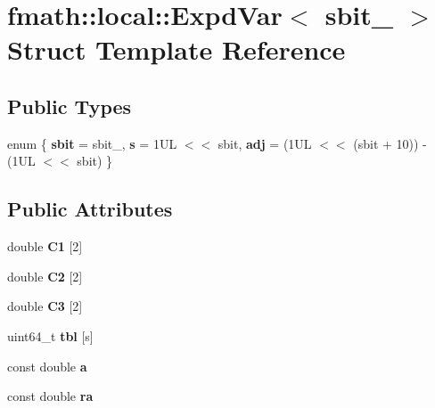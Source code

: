 \hypertarget{structfmath_1_1local_1_1ExpdVar}{\section{fmath\-:\-:local\-:\-:Expd\-Var$<$ sbit\-\_\- $>$ Struct Template Reference}
\label{structfmath_1_1local_1_1ExpdVar}
}
\subsection*{Public Types}
\begin{DoxyCompactItemize}
\item 
enum \{ {\bfseries sbit} =  sbit\-\_\-, 
{\bfseries s} =  1\-U\-L $<$$<$ sbit, 
{\bfseries adj} =  (1\-U\-L $<$$<$ (sbit + 10)) -\/ (1\-U\-L $<$$<$ sbit)
 \}
\end{DoxyCompactItemize}
\subsection*{Public Attributes}
\begin{DoxyCompactItemize}
\item 
\hypertarget{structfmath_1_1local_1_1ExpdVar_af606388231283be7fdc5d1798fd67e1f}{double {\bfseries C1} \mbox{[}2\mbox{]}}\label{structfmath_1_1local_1_1ExpdVar_af606388231283be7fdc5d1798fd67e1f}

\item 
\hypertarget{structfmath_1_1local_1_1ExpdVar_ae0fb99d69fbb0bf74964852b27f8780b}{double {\bfseries C2} \mbox{[}2\mbox{]}}\label{structfmath_1_1local_1_1ExpdVar_ae0fb99d69fbb0bf74964852b27f8780b}

\item 
\hypertarget{structfmath_1_1local_1_1ExpdVar_a80f6f7fd1f50eff920de040f486e14ca}{double {\bfseries C3} \mbox{[}2\mbox{]}}\label{structfmath_1_1local_1_1ExpdVar_a80f6f7fd1f50eff920de040f486e14ca}

\item 
\hypertarget{structfmath_1_1local_1_1ExpdVar_abc423bf622b1510b99da135198432e32}{uint64\-\_\-t {\bfseries tbl} \mbox{[}s\mbox{]}}\label{structfmath_1_1local_1_1ExpdVar_abc423bf622b1510b99da135198432e32}

\item 
\hypertarget{structfmath_1_1local_1_1ExpdVar_a674da3393d7caef2619d8252567df201}{const double {\bfseries a}}\label{structfmath_1_1local_1_1ExpdVar_a674da3393d7caef2619d8252567df201}

\item 
\hypertarget{structfmath_1_1local_1_1ExpdVar_ad7a104f06e0bae66f6f1818a88207b97}{const double {\bfseries ra}}\label{structfmath_1_1local_1_1ExpdVar_ad7a104f06e0bae66f6f1818a88207b97}

\end{DoxyCompactItemize}


